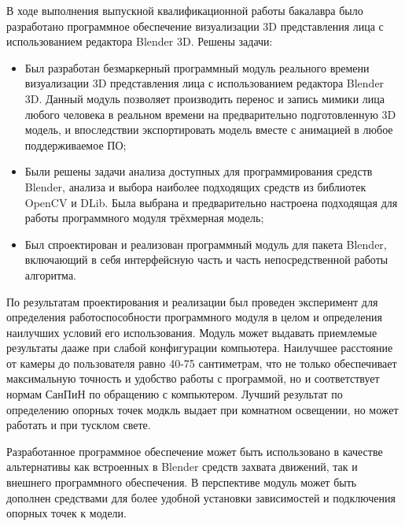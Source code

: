 
В ходе выполнения выпускной квалификационной работы бакалавра было разработано программное обеспечение визуализации 3D представления лица с использованием редактора Blender 3D. Решены задачи:
\begin{itemize}
	\item Был разработан безмаркерный программный модуль реального времени визуализации 3D представления лица
	с использованием редактора Blender 3D. Данный модуль позволяет производить перенос и запись мимики лица любого человека в реальном времени на предварительно подготовленную 3D модель, и впоследствии экспортировать модель вместе с анимацией в любое поддерживаемое ПО;
	\item Были решены задачи анализа доступных для программирования средств Blender, анализа и выбора наиболее подходящих средств из библиотек OpenCV и DLib. Была выбрана и предварительно настроена подходящая для работы программного модуля трёхмерная модель;
	\item Был спроектирован и  реализован программный модуль для пакета Blender, включающий в себя интерфейсную часть и часть непосредственной работы алгоритма.
\end{itemize}

По результатам проектирования и реализации был проведен эксперимент для определения работоспособности программного модуля в целом и определения наилучших условий его использования. Модуль может выдавать приемлемые результаты дааже при слабой конфигурации компьютера. Наилучшее расстояние от камеры до пользователя равно 40-75 сантиметрам, что не только обеспечивает максимальную точность и удобство работы с программой, но и соответствует нормам СанПиН по обращению с компьютером. Лучший результат по определению опорных точек модкль выдает при комнатном освещении, но может работать и при тусклом свете.


Разработанное программное обеспечение может быть использовано в качестве альтернативы как встроенных в Blender средств захвата движений, так и внешнего программного обеспечения. В перспективе модуль может быть дополнен средствами для более удобной установки зависимостей и подключения опорных точек к модели.



\clearpage
